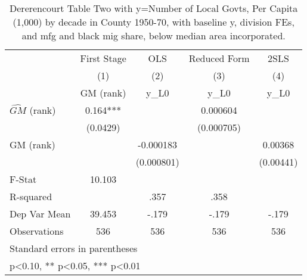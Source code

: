 \begin{table}[htbp]\centering
\def\sym#1{\ifmmode^{#1}\else\(^{#1}\)\fi}
\caption{Dererencourt Table Two with y=Number of Local Govts, Per Capita (1,000) by decade in County 1950-70, with baseline y, division FEs, and mfg and black mig share, below median area incorporated.}
\begin{tabular}{l*{4}{c}}
\toprule
                    & First Stage   &         OLS   &Reduced Form   &        2SLS   \\
                    &\multicolumn{1}{c}{(1)}&\multicolumn{1}{c}{(2)}&\multicolumn{1}{c}{(3)}&\multicolumn{1}{c}{(4)}\\
                    &\multicolumn{1}{c}{GM  (rank)}&\multicolumn{1}{c}{y\_L0}&\multicolumn{1}{c}{y\_L0}&\multicolumn{1}{c}{y\_L0}\\
\midrule
$\hat{GM}$ (rank)   &       0.164***&               &    0.000604   &               \\
                    &    (0.0429)   &               &  (0.000705)   &               \\
\addlinespace
GM  (rank)          &               &   -0.000183   &               &     0.00368   \\
                    &               &  (0.000801)   &               &   (0.00441)   \\
\midrule
F-Stat              &      10.103   &               &               &               \\
R-squared           &               &        .357   &        .358   &               \\
Dep Var Mean        &      39.453   &       -.179   &       -.179   &       -.179   \\
Observations        &         536   &         536   &         536   &         536   \\
\bottomrule
\multicolumn{5}{l}{\footnotesize Standard errors in parentheses}\\
\multicolumn{5}{l}{\footnotesize * p<0.10, ** p<0.05, *** p<0.01}\\
\end{tabular}
\end{table}
